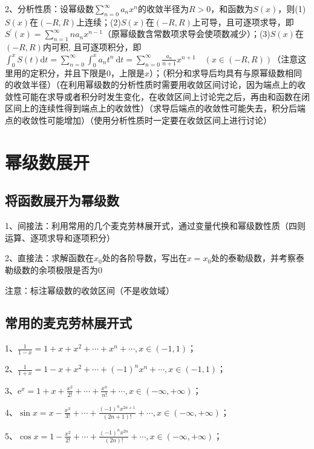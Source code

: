 2、分析性质：设幂级数$\sum_{n=0}^{\infty} a_{n} x^{n}$的收敛半径为$R>0$，和函数为$S(x)$，则(1)$S(x)$在$(-R, R)$上连续；(2)$S(x)$在$(-R, R)$上可导，且可逐项求导，即$S^{\prime}(x)=\sum_{n=1}^{\infty} n a_{n} x^{n-1}$（原幂级数含常数项求导会使项数减少）；(3)$S(x)$在$(-R, R)$内可积, 且可逐项积分，即$\int_{0}^{x} S(t) \mathrm{d} t=\sum_{n=0}^{\infty} \int_{0}^{x} a_{n} t^{n} \mathrm{~d} t=\sum_{n=0}^{\infty} \frac{a_{n}}{n+1} x^{n+1} \quad(x \in(-R, R))$（注意这里用的定积分，并且下限是$0$，上限是$x$）；（积分和求导后均具有与原幂级数相同的收敛半径）（在利用幂级数的分析性质时需要用收敛区间讨论，因为端点上的收敛性可能在求导或者积分时发生变化，在收敛区间上讨论完之后，再由和函数在闭区间上的连续性得到端点上的收敛性）（求导后端点的收敛性可能失去，积分后端点的收敛性可能增加）（使用分析性质时一定要在收敛区间上进行讨论）

\section{幂级数展开}



\subsection{将函数展开为幂级数}

1、间接法：利用常用的几个麦克劳林展开式，通过变量代换和幂级数性质（四则运算、逐项求导和逐项积分）

2、直接法：求解函数在$x_0$处的各阶导数，写出在$x=x_0$处的泰勒级数，并考察泰勒级数的余项极限是否为0

注意：标注幂级数的收敛区间（不是收敛域）



\subsection{常用的麦克劳林展开式}

1、$\frac{1}{1-x}=1+x+x^{2}+\cdots+x^{n}+\cdots, x \in(-1,1)$；

2、$\frac{1}{1+x}=1-x+x^{2}+\cdots+(-1)^{n} x^{n}+\cdots, x \in(-1,1)$；

3、$\mathrm{e}^{x}=1+x+\frac{x^{2}}{2 !}+\cdots+\frac{x^{n}}{n !}+\cdots, x \in(-\infty,+\infty)$；

4、$\sin x=x-\frac{x^{3}}{3 !}+\cdots+\frac{(-1)^{n} x^{2 n+1}}{(2 n+1) !}+\cdots, x \in(-\infty,+\infty)$；

5、$\cos x=1-\frac{x^{2}}{2 !}+\cdots+\frac{(-1)^{n} x^{2 n}}{(2 n) !}+\cdots, x \in(-\infty,+\infty)$；

